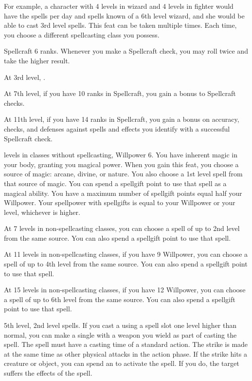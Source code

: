     For example, a character with 4 levels in wizard and 4 levels in fighter would have the spells per day and spells known of a 6th level wizard, and she would be able to cast 3rd level spells.
     This feat can be taken multiple times.
    Each time, you choose a different spellcasting class you possess.

    \featpre Spellcraft 6 ranks.
    \featben Whenever you make a Spellcraft check, you may roll twice and take the higher result.

    At 3rd level, \tdash.

    At 7th level, if you have 10 ranks in Spellcraft, you gain a  bonus to Spellcraft checks.

    At 11th level, if you have 14 ranks in Spellcraft, you gain a  bonus on accuracy, checks, and defenses against spells and  effects you identify with a successful Spellcraft check.

     levels in classes without spellcasting, Willpower 6.
    \featben You have inherent magic in your body, granting you magical power.
    When you gain this feat, you choose a source of magic: arcane, divine, or nature.
    You also choose a 1st level spell from that source of magic.
    You can spend a spellgift point to use that spell as a magical ability.
    You have a maximum number of spellgift points equal half your Willpower.
    Your spellpower with spellgifts is equal to your Willpower or your level, whichever is higher.

    At 7 levels in non-spellcasting classes, you can choose a spell of up to 2nd level from the same source. You can also spend a spellgift point to use that spell.

    At 11 levels in non-spellcasting classes, if you have 9 Willpower, you can choose a spell of up to 4th level from the same source. You can also spend a spellgift point to use that spell.

    At 15 levels in non-spellcasting classes, if you have 12 Willpower, you can choose a spell of up to 6th level from the same source. You can also spend a spellgift point to use that spell.

    \featpre 5th level, 2nd level spells.
    \featben If you cast a  using a spell slot one level higher than normal, you can make a single  with a weapon you wield as part of casting the spell.
    The spell must have a casting time of a standard action.
    The strike is made at the same time as other physical attacks in the action phase.
    If the strike hits a creature or object, you can spend an  to activate the spell.
    If you do, the target suffers the effects of the spell.

